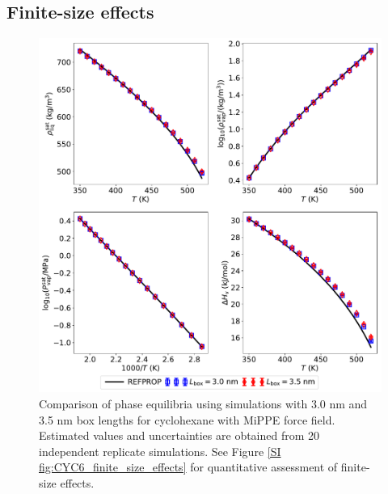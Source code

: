 \documentclass[journal=jctc,manuscript=article]{achemso}
\begin{document}
\newpage
\clearpage

\subsection{Finite-size effects} \label{SI sec: finite-size effects}

	\begin{figure}[H]
		\centering
		\includegraphics[width=5.8in]{CYC6_VLE_finite_size_effects.pdf}
		\caption{Comparison of phase equilibria using simulations with 3.0 nm and 3.5 nm box lengths for cyclohexane with MiPPE force field. Estimated values and uncertainties are obtained from 20 independent replicate simulations. See Figure \ref{SI fig:CYC6_finite_size_effects} for quantitative assessment of finite-size effects.}
		\label{SI fig: VLE CYC6_finite_size_effects}
	\end{figure}

	\newpage
	\clearpage
\end{document}
